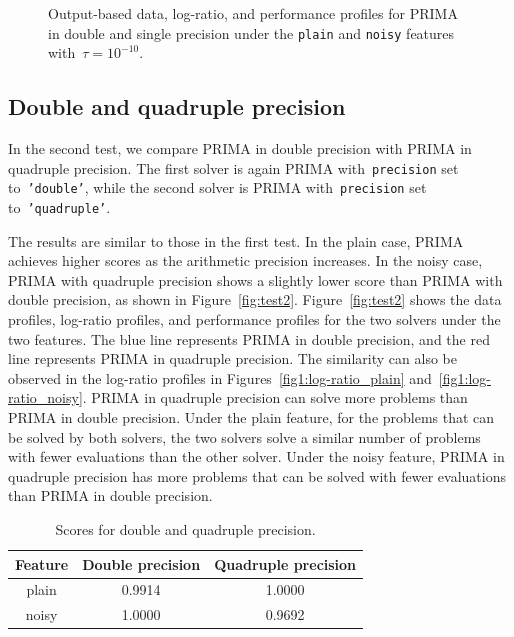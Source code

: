 \documentclass[12pt,a4paper]{article}  %
\theoremstyle{definition}
\numberwithin{equation}{section}
\begin{document}
\begin{figure}[htbp]
    \caption{Output-based data, log-ratio, and performance profiles for PRIMA in double and single precision under the \texttt{plain} and \texttt{noisy} features with~$\tau = 10^{-10}$.}
    \label{fig:test1}
\end{figure}


\subsection{Double and quadruple precision}

In the second test, we compare PRIMA in double precision with PRIMA in quadruple precision. 
The first solver is again PRIMA with~\texttt{precision} set to~\texttt{'double'}, while the second solver is PRIMA with~\texttt{precision} set to~\texttt{'quadruple'}.

The results are similar to those in the first test. In the plain case, PRIMA achieves higher scores as the arithmetic precision increases. In the noisy case, PRIMA with quadruple precision shows a slightly lower score than PRIMA with double precision, as shown in Figure~\ref{fig:test2}. Figure~\ref{fig:test2} shows the data profiles, log-ratio profiles, and performance profiles for the two solvers under the two features. The blue line represents PRIMA in double precision, and the red line represents PRIMA in quadruple precision. 
The similarity can also be observed in the log-ratio profiles in Figures~\ref{fig1:log-ratio_plain} and~\ref{fig1:log-ratio_noisy}. PRIMA in quadruple precision can solve more problems than PRIMA in double precision. Under the plain feature, for the problems that can be solved by both solvers, the two solvers solve a similar number of problems with fewer evaluations than the other solver. Under the noisy feature, PRIMA in quadruple precision has more problems that can be solved with fewer evaluations than PRIMA in double precision.
\begin{table}[htbp]
    
    \centering
    \caption{Scores for double and quadruple precision.}
    \label{tab:quad_precision_results}
    
    \begin{tabular}{ccc}
        \toprule
        \textbf{Feature} & \textbf{Double precision} & \textbf{Quadruple precision}   \\
        \midrule
        plain & 0.9914& 1.0000  \\
        noisy & 1.0000& 0.9692  \\
        \bottomrule
    \end{tabular}
    
\end{table}
\end{document}
